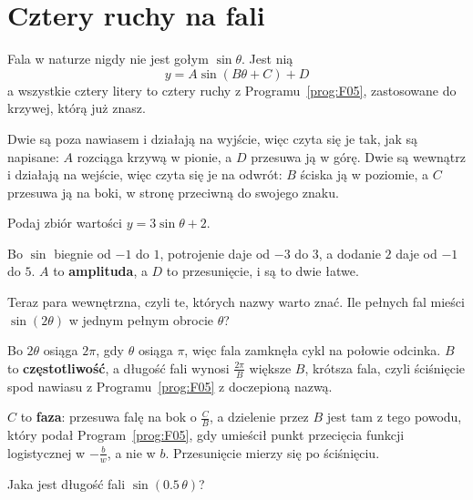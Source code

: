 \section{Cztery ruchy na fali}
\label{sec:F08-moves}

\begin{fr}
Fala w naturze nigdy nie jest gołym $\sin\theta$. Jest nią
\[ y = A\sin(B\theta + C) + D \]
a wszystkie cztery litery to cztery ruchy z Programu~\ref{prog:F05},
zastosowane do krzywej, którą już znasz.

Dwie są poza nawiasem i działają na wyjście, więc czyta się je tak, jak są
napisane: $A$ rozciąga krzywą w pionie, a $D$ przesuwa ją w górę. Dwie są
wewnątrz i działają na wejście, więc czyta się je na odwrót: $B$ ściska ją w
poziomie, a $C$ przesuwa ją na boki, w stronę przeciwną do swojego znaku.

Podaj zbiór wartości $y = 3\sin\theta + 2$.
\nextframe
\end{fr}

\begin{fr}
Bo $\sin$ biegnie od $-1$ do $1$, potrojenie daje od $-3$ do $3$, a dodanie
$2$ daje od $-1$ do $5$. $A$ to \textbf{amplituda}, a $D$ to przesunięcie, i
są to dwie łatwe.

Teraz para wewnętrzna, czyli te, których nazwy warto znać. Ile pełnych fal
mieści $\sin(2\theta)$ w jednym pełnym obrocie $\theta$?
\nextframe
\end{fr}

\begin{fr}
Bo $2\theta$ osiąga $2\pi$, gdy $\theta$ osiąga $\pi$, więc fala zamknęła
cykl na połowie odcinka. $B$ to \textbf{częstotliwość}, a długość fali wynosi
$\frac{2\pi}{B}$ \dash{} większe $B$, krótsza fala, czyli ściśnięcie spod
nawiasu z Programu~\ref{prog:F05} z doczepioną nazwą.

$C$ to \textbf{faza}: przesuwa falę na bok o $\frac{C}{B}$, a dzielenie przez
$B$ jest tam z tego powodu, który podał Program~\ref{prog:F05}, gdy umieścił
punkt przecięcia funkcji logistycznej w $-\frac{b}{w}$, a nie w $b$.
Przesunięcie mierzy się po ściśnięciu.

Jaka jest długość fali $\sin(\num{0.5}\,\theta)$?
\nextframe
\end{fr}

